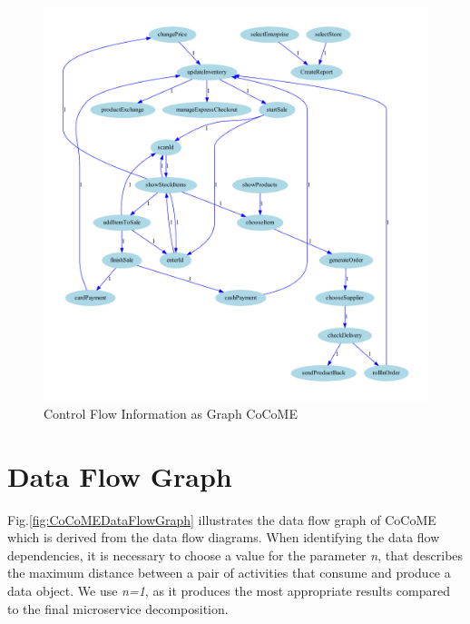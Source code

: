 \begin{figure}[h!]
	\centering
	\includegraphics[width=\textwidth, trim={2cm 0cm 2cm 0cm}]{img/CoCoMEControlFlowGraph.pdf}
	\caption{Control Flow Information as Graph CoCoME}
	\label{fig:CoCoMEControlFlowGraph}
\end{figure}


\section{Data Flow Graph}

Fig.\ref{fig:CoCoMEDataFlowGraph} illustrates the data flow graph of CoCoME which is derived from the data flow diagrams. When identifying the data flow dependencies, it is necessary to choose a value for the parameter \textit{n}, that describes the maximum distance between a pair of activities that consume and produce a data object. We use \textit{n=1}, as it produces the most appropriate results compared to the final microservice decomposition. 

